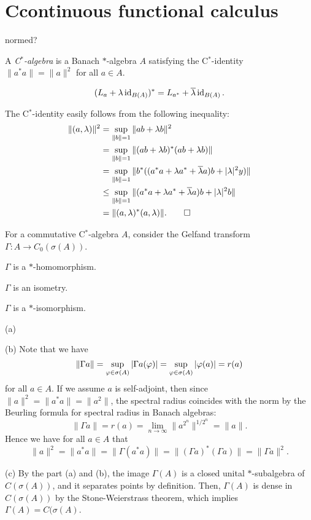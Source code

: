 \documentclass{../../large}
\begin{document}
\section{Ccontinuous functional calculus}
\begin{prb}[$*$-algebras]
normed?
\end{prb}


\begin{prb}[C$^*$-identity]
A \emph{C$^*$-algebra} is a Banach $*$-algebra $A$ satisfying the C$^*$-identity $\|a^*a\|=\|a\|^2$ for all $a\in A$.
\end{prb}


\begin{prb}[Unitization]
\[(L_a+\lambda\id_{B(A)})^*=L_{a^*}+\bar\lambda\id_{B(A)}.\]
\end{prb}
\begin{pf}
The C$^*$-identity easily follows from the following inequality:
\begin{align*}
\|(a,\lambda)\|^2&=\sup_{\|b\|=1}\|ab+\lambda b\|^2\\
&=\sup_{\|b\|=1}\|(ab+\lambda b)^*(ab+\lambda b)\|\\
&=\sup_{\|b\|=1}\|b^*((a^*a+\lambda a^*+\bar\lambda a)b+|\lambda|^2y)\|\\
&\le\sup_{\|b\|=1}\|(a^*a+\lambda a^*+\bar\lambda a)b+|\lambda|^2b\|\\
&=\|(a,\lambda)^*(a,\lambda)\|.\qedhere
\end{align*}
\end{pf}




\begin{prb}
For a commutative C$^*$-algebra $A$, consider the Gelfand transform $\Gamma:A\to C_0(\sigma(A))$.
\begin{parts}
\item $\Gamma$ is a $*$-homomorphism.
\item $\Gamma$ is an isometry.
\item $\Gamma$ is a $*$-isomorphism.
\end{parts}
\end{prb}
\begin{pf}
(a)

(b)
Note that we have
\[\|\Gamma a\|=\sup_{\f\in\sigma(A)}|\Gamma a(\f)|=\sup_{\f\in\sigma(A)}|\f(a)|=r(a)\]
for all $a\in A$.
If we assume $a$ is self-adjoint, then since $\|a\|^2=\|a^*a\|=\|a^2\|$, the spectral radius coincides with the norm by the Beurling formula for spectral radius in Banach algebras:
\[\|\Gamma a\|=r(a)=\lim_{n\to\infty}\|a^{2^n}\|^{1/2^n}=\|a\|.\]
Hence we have for all $a\in A$ that
\[\|a\|^2=\|a^*a\|=\|\Gamma(a^*a)\|=\|(\Gamma a)^*(\Gamma a)\|=\|\Gamma a\|^2.\]

(c)
By the part (a) and (b), the image $\Gamma(A)$ is a closed unital $*$-subalgebra of $C(\sigma(A))$, and it separates points by definition.
Then, $\Gamma(A)$ is dense in $C(\sigma(A))$ by the Stone-Weierstrass theorem, which implies $\Gamma(A)=C(\sigma(A)$.
\end{pf}
\end{document}
